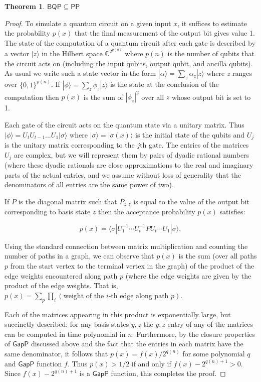 \documentclass[11pt]{report}
\theoremstyle{plain}
\newtheorem{theorem}{Theorem}[section]
\theoremstyle{definition}
\renewcommand{\ket}[1]{|#1\rangle}
\begin{document}
\begin{theorem}
\label{bqppp}
$\mathsf{BQP} \subseteq \mathsf{PP}$
\end{theorem}

\begin{proof}
To simulate a quantum circuit on a given input $x$, it suffices to estimate the probability $p(x)$ that
the final measurement of the output bit gives value 1.
The state of the computation of a quantum circuit after each gate
is described by a vector $\ket{z}$ in the Hilbert space
$\mathbb{C}^{2^{p(n)}}$ where $p(n)$ is the number of qubits that the circuit
acts on (including the input qubits, output qubit, and ancilla qubits).
As usual we write such a state vector in the form $\ket{\alpha} = \sum_{z} \alpha_z|z\rangle$
where $z$ ranges over $\{0,1\}^{p(n)}$.
If $\ket{\phi}=\sum_z \phi_z \ket{z}$ is the state at the conclusion of the computation then
$p(x)$ is the sum of $|\phi_{z}|^2$ over all
$z$ whose output bit is set to 1.

Each gate of the circuit acts on the quantum state via a unitary matrix.
Thus $\ket{\phi} = U_tU_{t-1}\ldots U_1 \ket{\sigma}$ where $\ket{\sigma}=\ket{\sigma(x)}$ is the
initial state of the qubits and $U_j$ is the unitary matrix corresponding to the $j$th gate.  The entries of the matrices $U_j$ are complex, but we will
represent them by pairs of dyadic rational numbers (where these dyadic
rationals are close approximations to the real and imaginary parts of the
actual entries, and we assume without loss of generality that the denominators
of all entries are the same power of two).

If $P$ is the diagonal matrix such that $P_{z,z}$ is equal to the value of the output bit corresponding to basis
state $z$ then the acceptance probability $p(x)$ satisfies:

\[
p(x) = \langle \sigma |U_1^{-1} \cdots U_t^{-1}PU_t \cdots U_1\ket{\sigma},
\]

Using the standard connection between matrix multiplication and counting
the number of paths in a graph, we can observe that $p(x)$ is the sum
(over all paths $p$ from the start vertex to the terminal vertex in the graph)
of the product of the edge weights encountered along path $p$ (where the
edge weights are given by the product of the edge weights.
That is, $p(x) = \sum_p \prod_i (\mbox{weight of the $i$-th edge along path $p$})$.

Each of the matrices appearing in this product is exponentially large, but succinctly described: for any
basis states $y,z$ the $y,z$ entry of any of the matrices can be computed in
time polynomial in $n$.
Furthermore, by the closure properties of $\mathsf{GapP}$ discussed above and
the fact that the entries in each matrix have the same denominator, it follows
that $p(x) = f(x)/2^{q(n)}$ for some polynomial
$q$ and $\mathsf{GapP}$ function $f$.  Thus $p(x) > 1/2$ if and only if
$f(x) - 2^{q(n)+1} > 0$.
Since $f(x) - 2^{q(n)+1}$ is a $\mathsf{GapP}$ function, this completes
the proof.
\end{proof}
\end{document}
